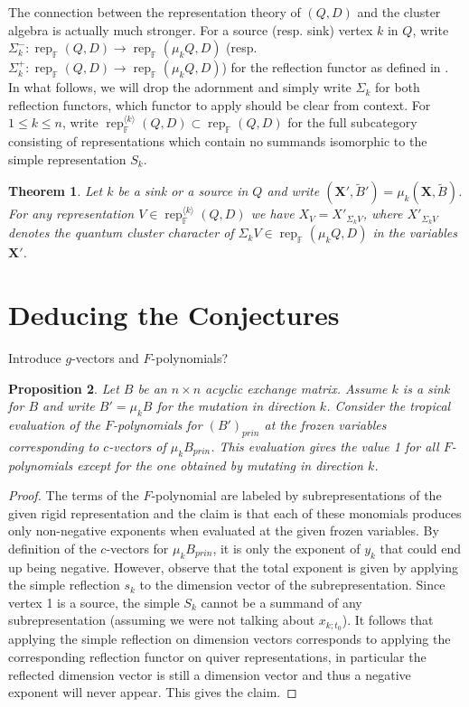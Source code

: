 \documentclass{amsart}
\newtheorem{theorem}{Theorem}
\newtheorem{proposition}[theorem]{Proposition}
\newcommand{\bfX}{\mathbf{X}}
\newcommand{\FF}{\mathbb{F}}
\newcommand{\rep}{\operatorname{rep}}
\begin{document}
  The connection between the representation theory of $(Q,D)$ and the cluster algebra is actually much stronger.  For a source (resp. sink) vertex $k$ in $Q$, write $\Sigma_k^-:\rep_\FF(Q,D)\to\rep_\FF(\mu_kQ,D)$ (resp. $\Sigma_k^+:\rep_\FF(Q,D)\to\rep_\FF(\mu_kQ,D)$) for the reflection functor as defined in \cite[Sec. 2]{dlab-ringel}.  
  In what follows, we will drop the adornment and simply write $\Sigma_k$ for both reflection functors, which functor to apply should be clear from context.
  For $1\le k\le n$, write $\rep_\FF^{\langle k\rangle}(Q,D)\subset\rep_\FF(Q,D)$ for the full subcategory consisting of representations which contain no summands isomorphic to the simple representation $S_k$.
  \begin{theorem}\cite{rupel1}
    \label{th:reflection functor}
    Let $k$ be a sink or a source in $Q$ and write $(\bfX',\tilde B')=\mu_k(\bfX,\tilde B)$.  
    For any representation $V\in\rep_\FF^{\langle k\rangle}(Q,D)$ we have $X_V=X'_{\Sigma_kV}$, where $X'_{\Sigma_kV}$ denotes the quantum cluster character of $\Sigma_kV\in\rep_\FF(\mu_kQ,D)$ in the variables $\bfX'$.
  \end{theorem}

  \section{Deducing the Conjectures}
  Introduce $g$-vectors and $F$-polynomials?

  \begin{proposition}
    \label{prop:principal F-polynomials}
    Let $B$ be an $n\times n$ acyclic exchange matrix.
    Assume $k$ is a sink for $B$ and write $B'=\mu_k B$ for the mutation in direction $k$.
    Consider the tropical evaluation of the $F$-polynomials for $(B')_{prin}$ at the frozen variables corresponding to $c$-vectors of $\mu_k B_{prin}$.
    This evaluation gives the value 1 for all $F$-polynomials except for the one obtained by mutating in direction $k$.
  \end{proposition}
  \begin{proof}
    The terms of the $F$-polynomial are labeled by subrepresentations of the given rigid representation and the claim is that each of these monomials produces only non-negative exponents when evaluated at the given frozen variables.
    By definition of the $c$-vectors for $\mu_k B_{prin}$, it is only the exponent of $y_k$ that could end up being negative.
    However, observe that the total exponent is given by applying the simple reflection $s_k$ to the dimension vector of the subrepresentation.
    Since vertex 1 is a source, the simple $S_k$ cannot be a summand of any subrepresentation (assuming we were not talking about $x_{k;t_0}$).
    It follows that applying the simple reflection on dimension vectors corresponds to applying the corresponding reflection functor on quiver representations, in particular the reflected dimension vector is still a dimension vector and thus a negative exponent will never appear.
    This gives the claim.
  \end{proof}
\end{document}
